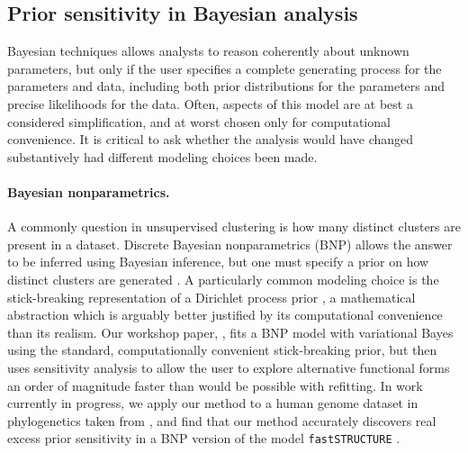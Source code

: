 \subsection*{Prior sensitivity in Bayesian analysis}

Bayesian techniques allows analysts to reason coherently about unknown
parameters, but only if the user specifies a complete generating process for the
parameters and data, including both prior distributions for the parameters and
precise likelihoods for the data.  Often, aspects of this model are at best a
considered simplification, and at worst chosen only for computational
convenience.  It is critical to ask whether the analysis would have changed
substantively had different modeling choices been made.

\paragraph{Bayesian nonparametrics.}

A commonly question in unsupervised clustering is how many distinct clusters are
present in a dataset.  Discrete Bayesian nonparametrics (BNP) allows the answer
to be inferred using Bayesian inference, but one must specify a prior on how
distinct clusters are generated \citep{ghosh:2003:bnp,
gershman:2012:bnptutorial}.  A particularly common modeling choice is the
stick-breaking representation of a Dirichlet process prior
\citep{sethuraman:1994:constructivedp}, a mathematical abstraction which is
arguably better justified by its computational convenience than its realism. Our
workshop paper, \citet{giordano:2018:bnpsensitivity}, fits a BNP model with
variational Bayes \citep{blei:2006:dirichletbnp} using the standard,
computationally convenient stick-breaking prior, but then uses sensitivity
analysis to allow the user to explore alternative functional forms an order of
magnitude faster than would be possible with refitting. In work currently in
progress, we apply our method to a human genome dataset in phylogenetics taken
from \citep{huang:2011:haplotype}, and find that our method accurately discovers
real excess prior sensitivity in a BNP version of the model
\texttt{fastSTRUCTURE} \citep{raj:2014:faststructure}.



